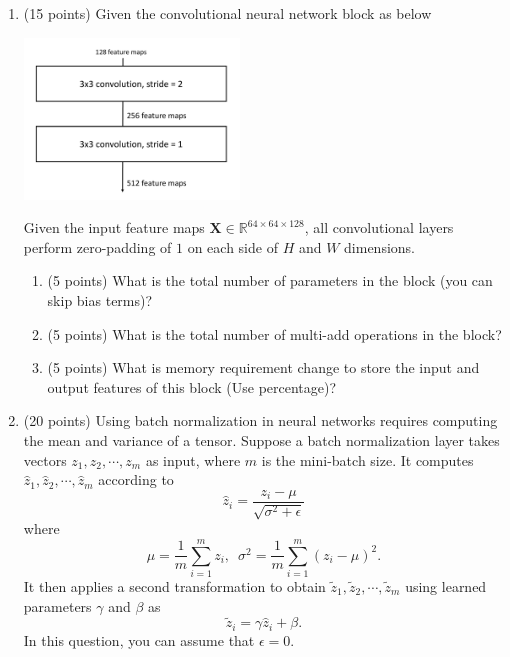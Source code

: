 \documentclass[11pt]{article}
\begin{document}
\begin{enumerate}

    \item (15 points) Given the convolutional neural network block as below
    \begin{center}
        \vspace{-10pt}
        \includegraphics[width=0.45\textwidth]{FIG/cnnblock.pdf}
    \end{center}
    Given the input feature maps $\boldsymbol X \in
    \mathbb{R}^{64\times 64 \times 128}$, all convolutional
    layers perform zero-padding of $1$ on each side of $H$ and
    $W$ dimensions.
    \begin{enumerate}
    \item (5 points) What is the total number of parameters in
    the block (you can skip bias terms)?


    \item (5 points) What is the total number of multi-add
    operations in the block?


    \item (5 points) What is memory requirement change to store
    the input and output features of this block (Use percentage)?
    \end{enumerate}

    
    \item (20 points) Using batch normalization in neural networks requires computing
    the mean and variance of a tensor. Suppose a batch normalization
    layer takes vectors $z_1,z_2,\cdots,z_m$ as input, where $m$ is the
    mini-batch size. It computes $\hat z_1,\hat z_2,\cdots,\hat z_m$
    according to $$\hat z_i=\frac{z_i-\mu}{\sqrt{\sigma^2+\epsilon}}$$
    where $$\mu=\frac{1}{m}\sum_{i=1}^m
    z_i,\,\,\,\sigma^2=\frac{1}{m}\sum_{i=1}^m(z_i-\mu)^2.$$ It then
    applies a second transformation to obtain $\tilde z_1,\tilde
    z_2,\cdots,\tilde z_m$ using learned parameters $\gamma$ and $\beta$
    as $$\tilde z_i=\gamma \hat z_i+\beta.$$ In this question, you can
    assume that $\epsilon=0$.
    

\end{enumerate}
\end{document}
